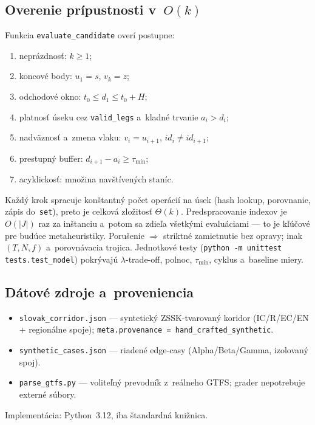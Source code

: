 \documentclass[11pt,a4paper]{article}
\begin{document}
\subsection{Overenie prípustnosti v~$O(k)$}

Funkcia \texttt{evaluate\_candidate} overí postupne:
\begin{enumerate}[label=\arabic*.]
  \item neprázdnosť: $k\ge 1$;
  \item koncové body: $u_1=s$, $v_k=z$;
  \item odchodové okno: $t_0\le d_1\le t_0+H$;
  \item platnosť úseku cez \texttt{valid\_legs} a~kladné trvanie $a_i>d_i$;
  \item nadväznosť a~zmena vlaku: $v_i=u_{i+1}$, $id_i\neq id_{i+1}$;
  \item prestupný buffer: $d_{i+1}-a_i\ge\tau_{\min}$;
  \item acyklickosť: množina navštívených staníc.
\end{enumerate}
Každý krok spracuje konštantný počet operácií na úsek (hash lookup,
porovnanie, zápis do~\texttt{set}), preto je celková zložitosť $\Theta(k)$.
Predspracovanie indexov je $O(|J|)$ raz za inštanciu a~potom sa zdieľa
všetkými evaluáciami --- to je kľúčové pre budúce metaheuristiky.
Porušenie $\Rightarrow$ striktné zamietnutie bez opravy; inak
$(T,N,f)$ a~porovnávacia trojica. Jednotkové testy
(\texttt{python -m unittest tests.test\_model}) pokrývajú $\lambda$-trade-off,
polnoc, $\tau_{\min}$, cyklus a~baseline miery.

\subsection{Dátové zdroje a~proveniencia}

\begin{itemize}
  \item \texttt{slovak\_corridor.json} --- syntetický ZSSK-tvarovaný koridor
        (IC/R/EC/EN + regionálne spoje); \texttt{meta.provenance =
        hand\_crafted\_synthetic}.
  \item \texttt{synthetic\_cases.json} --- riadené edge-casy
        (Alpha/Beta/Gamma, izolovaný spoj).
  \item \texttt{parse\_gtfs.py} --- voliteľný prevodník z~reálneho GTFS;
        grader nepotrebuje externé súbory.
\end{itemize}
Implementácia: Python~3.12, iba štandardná knižnica.
\end{document}
